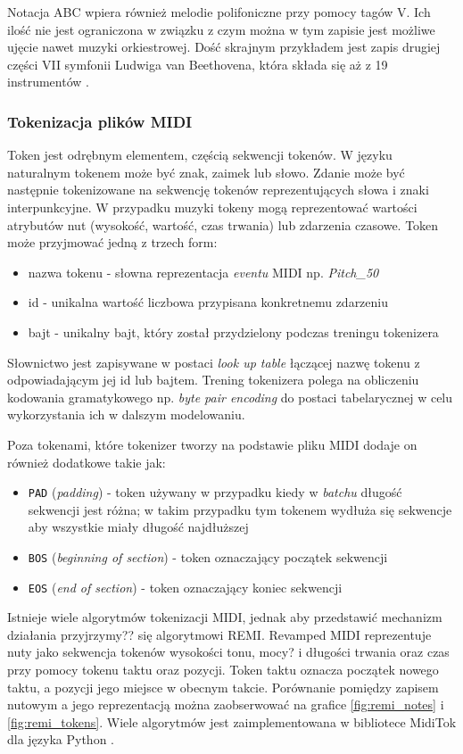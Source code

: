 \documentclass[data-science]{agh-wi} %
\begin{document}
Notacja ABC wpiera również melodie polifoniczne przy pomocy tagów V. Ich ilość nie jest ograniczona w związku z czym można w tym zapisie jest możliwe ujęcie nawet muzyki orkiestrowej. Dość skrajnym przykładem jest zapis drugiej części VII symfonii Ludwiga van Beethovena, która składa się aż z 19 instrumentów \cite{beethoven}.

\subsubsection{Tokenizacja plików MIDI}\label{sec:REMI}
Token jest odrębnym elementem, częścią sekwencji tokenów. W języku naturalnym tokenem może być znak, zaimek lub słowo. Zdanie może być następnie tokenizowane na sekwencję tokenów reprezentujących słowa i znaki interpunkcyjne. W przypadku muzyki tokeny mogą reprezentować wartości atrybutów nut (wysokość, wartość, czas trwania) lub zdarzenia czasowe. Token może przyjmować jedną z trzech form:
\begin{itemize}
    \item nazwa tokenu - słowna reprezentacja \textit{eventu} MIDI np. \textit{Pitch\_50}
    \item id - unikalna wartość liczbowa przypisana konkretnemu zdarzeniu
    \item bajt - unikalny bajt, który został przydzielony podczas treningu tokenizera
\end{itemize}

Słownictwo jest zapisywane w postaci \textit{look up table} łączącej nazwę tokenu z odpowiadającym jej id lub bajtem. Trening tokenizera polega na obliczeniu kodowania gramatykowego np. \textit{byte pair encoding} do postaci tabelarycznej w celu wykorzystania ich w dalszym modelowaniu.

Poza tokenami, które tokenizer tworzy na podstawie pliku MIDI dodaje on również dodatkowe takie jak:
\begin{itemize}
    \item \texttt{PAD} (\textit{padding}) - token używany w przypadku kiedy w \textit{batchu} długość sekwencji jest różna; w takim przypadku tym tokenem wydłuża się sekwencje aby wszystkie miały długość najdłuższej
    \item \texttt{BOS} (\textit{beginning of section}) - token oznaczający początek sekwencji
    \item \texttt{EOS} (\textit{end of section}) - token oznaczający koniec sekwencji
\end{itemize}

Istnieje wiele algorytmów tokenizacji MIDI, jednak aby przedstawić mechanizm działania przyjrzymy?? się algorytmowi REMI. Revamped MIDI \cite{remi} reprezentuje nuty jako sekwencja tokenów wysokości tonu, mocy? i długości trwania oraz czas przy pomocy tokenu taktu oraz pozycji. Token taktu oznacza początek nowego taktu, a pozycji jego miejsce w obecnym takcie. Porównanie pomiędzy zapisem nutowym a jego reprezentacją można zaobserwować na grafice \ref*{fig:remi_notes} i \ref*{fig:remi_tokens}. Wiele algorytmów jest zaimplementowana w bibliotece MidiTok dla języka Python \cite{miditok2021}.
\end{document}
